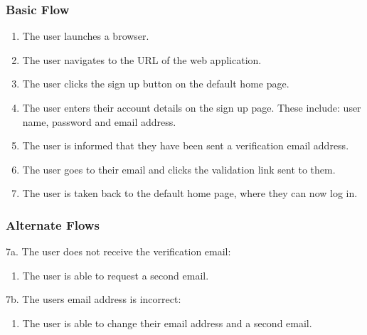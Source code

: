 \documentclass[12pt,onecolumn]{article}
\begin{document}
		\subsubsection{Basic Flow}

		\begin{enumerate}
			\item The user launches a browser.

			\item The user navigates to the URL of the web application.

			\item The user clicks the sign up button on the default home page.

			\item The user enters their account details on the sign up page. These include: user name, password and email address.

			\item The user is informed that they have been sent a verification email address.

			\item The user goes to their email and clicks the validation link sent to them.

			\item The user is taken back to the default home page, where they can now log in.

		\end{enumerate}

		\subsubsection{Alternate Flows}

		7a. The user does not receive the verification email:

		\begin{enumerate}
			\item The user is able to request a second email.
		\end{enumerate}

		7b. The users email address is incorrect:

		\begin{enumerate}
			\item The user is able to change their email address and a second email.
		\end{enumerate}
\end{document}
